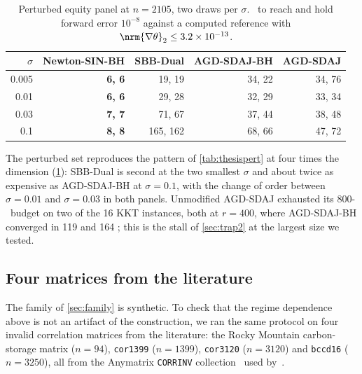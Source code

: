 \begin{table}[t]
\centering
\caption{Perturbed equity panel at $n=2105$, two draws per $\sigma$. \EVDs\ to
reach and hold forward error $10^{-8}$ against a computed reference with
$\nrm{\nabla\theta}_2\le3.2\times10^{-13}$.}
\label{tab:us2105pert}
\small
\begin{tabular}{rrrrr}
\toprule
$\sigma$ & Newton-SIN-BH & SBB-Dual & AGD-SDAJ-BH & AGD-SDAJ\\
\midrule
0.005 & \textbf{6, 6} & 19, 19   & 34, 22 & 34, 76\\
0.01  & \textbf{6, 6} & 29, 28   & 32, 29 & 33, 34\\
0.03  & \textbf{7, 7} & 71, 67   & 37, 44 & 38, 48\\
0.1   & \textbf{8, 8} & 165, 162 & 68, 66 & 47, 72\\
\bottomrule
\end{tabular}
\end{table}

The perturbed set reproduces the pattern of \cref{tab:thesispert} at four times
the dimension (\cref{tab:us2105pert}): SBB-Dual is second at the two smallest
$\sigma$ and about twice as expensive as AGD-SDAJ-BH at $\sigma=0.1$, with the
change of order between $\sigma=0.01$ and $\sigma=0.03$ in both panels.
Unmodified AGD-SDAJ exhausted its 800-\EVD\ budget on two of the 16 KKT
instances, both at $r=400$, where AGD-SDAJ-BH converged in 119 and 164 \EVDs;
this is the stall of \cref{sec:trap2} at the largest size we tested.

\subsection{Four matrices from the literature}\label{sec:real}
The family of \cref{sec:family} is synthetic. To check that the regime
dependence above is not an artifact of the construction, we ran the same
protocol on four invalid correlation matrices from the literature: the
Rocky Mountain carbon-storage matrix ($n=94$), \texttt{cor1399} ($n=1399$),
\texttt{cor3120} ($n=3120$) and \texttt{bccd16} ($n=3250$), all from the
Anymatrix \texttt{CORRINV} collection~\cite{higham2022anymatrix} used
by~\cite{huynh2025accelerated}.

